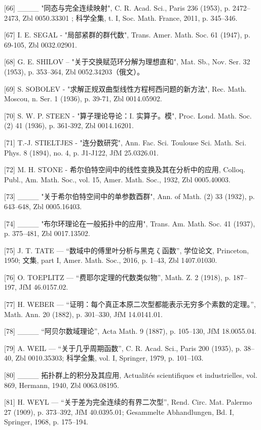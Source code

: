 {[}66{]} \_\_\_\_ "同态与完全连续映射", C. R. Acad. Sci., Paris 236 (1953), p. 2472--2473, Zbl 0050.33301 ; 科学全集, t. I, Soc. Math. France, 2011, p. 345--346.

{[}67{]} I. E. SEGAL - "局部紧群的群代数", Trans. Amer. Math. Soc. 61 (1947), p. 69-105, Zbl 0032.02901.

{[}68{]} G. E. SHILOV -- "关于交换赋范环分解为理想直和", Mat. Sb., Nov. Ser. 32 (1953), p. 353--364, Zbl 0052.34203（俄文）。

{[}69{]} S. SOBOLEV - "求解正规双曲型线性方程柯西问题的新方法", Rec. Math. Moscou, n. Ser. 1 (1936), p. 39-71, Zbl 0014.05902.

{[}70{]} S. W. P. STEEN - "算子理论导论：I. 实算子。模", Proc. Lond. Math. Soc. (2) 41 (1936), p. 361-392, Zbl 0014.16201.

{[}71{]} T.-J. STIELTJES - "连分数研究", Ann. Fac. Sci. Toulouse Sci. Math. Sci. Phys. 8 (1894), no. 4, p. J1-J122, JfM 25.0326.01.

{[}72{]} M. H. STONE - 希尔伯特空间中的线性变换及其在分析中的应用, Colloq. Publ., Am. Math. Soc., vol. 15, Amer. Math. Soc., 1932, Zbl 0005.40003.

{[}73{]} \_\_\_\_ "关于希尔伯特空间中的单参数酉群", Ann. of Math. (2) 33 (1932), p. 643--648, Zbl 0005.16403.

{[}74{]} \_\_\_\_ "布尔环理论在一般拓扑中的应用", Trans. Am. Math. Soc. 41 (1937), p. 375--481, Zbl 0017.13502.

{[}75{]} J. T. TATE — “数域中的傅里叶分析与黑克 ζ 函数”, 学位论文, Princeton, 1950; 文集, part I, Amer. Math. Soc., 2016, p. 1–43, Zbl 1407.01030.

{[}76{]} O. TOEPLITZ — “费耶尔定理的代数类似物”, Math. Z. 2 (1918), p. 187–197, JfM 46.0157.02.

{[}77{]} H. WEBER — “证明：每个真正本原二次型都能表示无穷多个素数的定理。”, Math. Ann. 20 (1882), p. 301–330, JfM 14.0141.01.

{[}78{]} \_\_\_\_ “阿贝尔数域理论”, Acta Math. 9 (1887), p. 105–130, JfM 18.0055.04.

{[}79{]} A. WEIL — “关于几乎周期函数”, C. R. Acad. Sci., Paris 200 (1935), p. 38–40, Zbl 0010.35303; 科学全集, vol. I, Springer, 1979, p. 101–103.

{[}80{]} \_\_\_\_ 拓扑群上的积分及其应用, Actualités scientifiques et industrielles, vol. 869, Hermann, 1940, Zbl 0063.08195.

{[}81{]} H. WEYL — “关于差为完全连续的有界二次型”, Rend. Circ. Mat. Palermo 27 (1909), p. 373–392, JfM 40.0395.01; Gesammelte Abhandlungen, Bd. I, Springer, 1968, p. 175–194.

